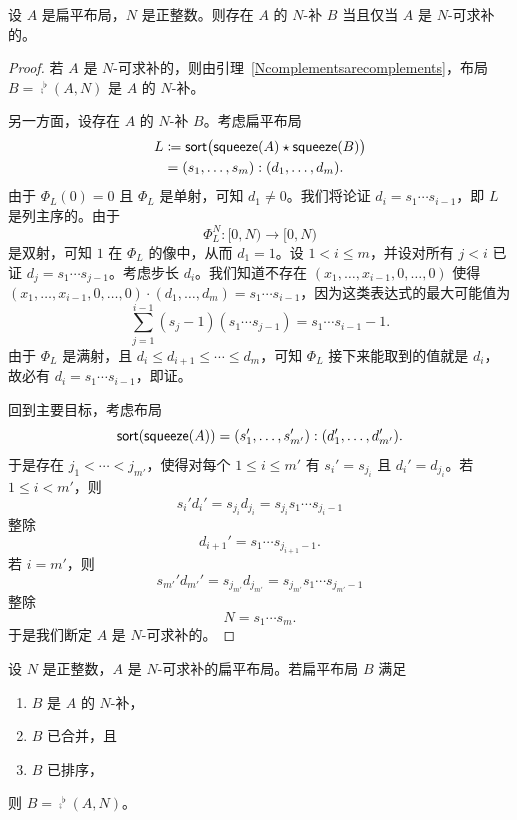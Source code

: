\begin{proposition}\label{characterizationofexistenceofNcomplements}
    设 $A$ 是扁平布局，$N$ 是正整数。则存在 $A$ 的 $N$-补 $B$ 当且仅当 $A$ 是 $N$-可求补的。
\end{proposition}

\begin{proof}
    若 $A$ 是 $N$-可求补的，则由引理~\ref{Ncomplementsarecomplements}，布局 $B = \comp^\flat(A,N)$
    是 $A$ 的 $N$-补。

    另一方面，设存在 $A$ 的 $N$-补 $B$。考虑扁平布局
    \begin{align*} L & \coloneq \mathsf{sort}\bigl(\mathsf{squeeze}(A)\star \mathsf{squeeze}(B)\bigr) \\
    & = (s_1,\dots,s_m):(d_1,\dots,d_m).
    \end{align*}
    由于 $\Phi_L(0) = 0$ 且 $\Phi_L$ 是单射，可知 $d_1 \neq 0$。我们将论证 $d_i = s_1 \cdots s_{i-1}$，即 $L$ 是列主序的。由于
    \[\Phi_L^{N} : [0,N) \to [0,N)\]
    是双射，可知 $1$ 在 $\Phi_L$ 的像中，从而 $d_1 = 1$。设 $1 < i \leq m$，并设对所有 $j < i$ 已证 $d_j = s_1 \cdots s_{j-1}$。考虑步长 $d_{i}$。我们知道不存在 $(x_1,\dots,x_{i-1},0,\dots,0)$ 使得 $(x_1,\dots,x_{i-1},0,\dots,0) \cdot (d_1,\dots,d_m) = s_1\cdots s_{i-1}$，因为这类表达式的最大可能值为
    \[
    \sum_{j = 1}^{i-1} (s_j-1)(s_1\cdots s_{j-1}) = s_1 \cdots s_{i-1} - 1.
    \]
    由于 $\Phi_L$ 是满射，且 $d_i \leq  d_{i+1} \leq  \cdots \leq  d_m$，可知 $\Phi_L$ 接下来能取到的值就是 $d_i$，故必有 $d_i = s_1\cdots s_{i-1}$，即证。

    回到主要目标，考虑布局
    \[\mathsf{sort}(\mathsf{squeeze}(A)) = (s_1',\dots,s_{m'}'):(d_1',\dots,d_{m'}').\] 于是存在 $j_1 < \cdots < j_{m'}$，使得对每个 $1 \leq i \leq m'$ 有 $s_i' = s_{j_i}$ 且 $d_i' = d_{j_i}$。若 $1 \leq i < m'$，则
    \[
    s_i'd_i' = s_{j_i}d_{j_i} = s_{j_i} s_1 \cdots s_{j_i - 1}
    \]
    整除
    \[
    d_{i+1}' = s_1 \cdots s_{j_{i+1}-1}.
    \]
    若 $i = m'$，则
    \[
    s_{m'}'d_{m'}' = s_{j_{m'}}d_{j_{m'}} = s_{j_{m'}} s_1 \cdots s_{j_{m'} - 1}
    \]
    整除
    \[
    N = s_1 \cdots s_m.
    \]
    于是我们断定 $A$ 是 $N$-可求补的。
\end{proof}


\begin{proposition}\label{characterizationofflatNcomplement}
    设 $N$ 是正整数，$A$ 是 $N$-可求补的扁平布局。若扁平布局 $B$ 满足
    \begin{enumerate}
        \item $B$ 是 $A$ 的 $N$-补，
        \item $B$ 已合并，且
        \item $B$ 已排序，
    \end{enumerate}
    则 $B = \comp^\flat(A,N)$。
\end{proposition}

